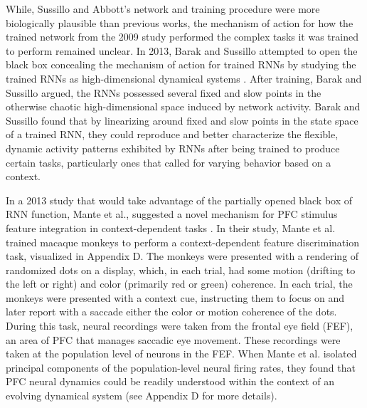 \documentclass[12pt,a4paper,final]{iopart}
\begin{document}
While, Sussillo and Abbott’s network and training procedure were more biologically plausible than previous works, the mechanism of action for how the trained network from the 2009 study performed the complex tasks it was trained to perform remained unclear. In 2013, Barak and Sussillo attempted to open the black box concealing the mechanism of action for trained RNNs by studying the trained RNNs as high-dimensional dynamical systems \cite{BarakSussillo}. After training, Barak and Sussillo argued, the RNNs possessed several fixed and slow points in the otherwise chaotic high-dimensional space induced by network activity. Barak and Sussillo found that by linearizing around fixed and slow points in the state space of a trained RNN, they could reproduce and better characterize the flexible, dynamic activity patterns exhibited by RNNs after being trained to produce certain tasks, particularly ones that called for varying behavior based on a context.

In a 2013 study that would take advantage of the partially opened black box of RNN function, Mante et al., suggested a novel mechanism for PFC stimulus feature integration in context-dependent tasks \cite{Mante2013}. In their study, Mante et al. trained macaque monkeys to perform a context-dependent feature discrimination task, visualized in Appendix D. The monkeys were presented with a rendering of randomized dots on a display, which, in each trial, had some motion (drifting to the left or right) and color (primarily red or green) coherence. In each trial, the monkeys were presented with a context cue, instructing them to focus on and later report with a saccade either the color or motion coherence of the dots. During this task, neural recordings were taken from the frontal eye field (FEF), an area of PFC that manages saccadic eye movement. These recordings were taken at the population level of neurons in the FEF. When Mante et al. isolated principal components of the population-level neural firing rates, they found that PFC neural dynamics could be readily understood within the context of an evolving dynamical system (see Appendix D for more details).
\end{document}
